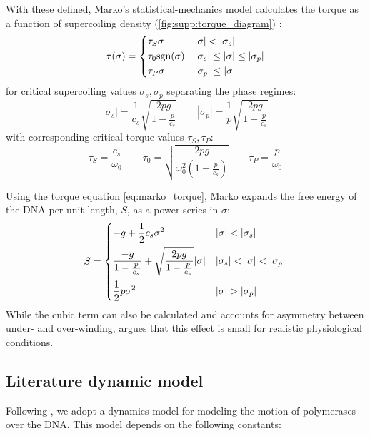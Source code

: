 \documentclass[11pt]{article}
\begin{document}
With these defined, Marko's statistical-mechanics model calculates the torque as a function of supercoiling density (\cref{fig:supp:torque_diagram}) \parencite{markoTorqueDynamicsLinking2007}:
\begin{equation}
    \tau(\sigma) = \begin{dcases} \tau_S \sigma & |\sigma| < |\sigma_s| \\ \tau_0 \text{sgn}(\sigma) & |\sigma_s| \leq |\sigma | \leq |\sigma_p| \\ \tau_P \sigma & |\sigma_p| \leq |\sigma|\end{dcases}
    \label{eq:marko_torque}
\end{equation}
for critical supercoiling values \(\sigma_s, \sigma_p\) separating the phase regimes:
\begin{equation}
    |\sigma_s| = \frac{1}{c_s} \sqrt{\frac{2pg}{1 - \frac{p}{c_s}}} \qquad |\sigma_p| = \frac{1}{p} \sqrt{\frac{2pg}{1 - \frac{p}{c_s}}}
    \label{eq:critical_sigma_values}
\end{equation}
with corresponding critical torque values \(\tau_S, \tau_P\):
\begin{equation}
    \tau_S = \frac{c_s}{\omega_0} \qquad \tau_0 = \sqrt{\frac{2 pg}{\omega_0^2 \left(1 - \frac{p}{c_s}\right)}} \qquad \tau_P = \frac{p}{\omega_0}
    \label{eq:critical_tau_values}
\end{equation}

Using the torque equation \cref{eq:marko_torque}, Marko expands the free energy of the DNA per unit length, \(S\), as a power series in \(\sigma\):
\begin{equation}
    S = \begin{dcases}
        -g + \frac{1}{2} c_s \sigma^2 & |\sigma| < |\sigma_s| \\
        \frac{-g}{1 - \frac{p}{c_s}} + \sqrt{\frac{2 p g}{1 - \frac{p}{c_s}}} |\sigma| & |\sigma_s| < |\sigma| < |\sigma_p| \\
        \frac{1}{2} p \sigma^2 & |\sigma| > |\sigma_p|
    \end{dcases}
    \label{eq:marko_energy}
\end{equation}
While the cubic term can also be calculated and accounts for asymmetry between under- and over-winding,  \textcite{markoTorqueDynamicsLinking2007} argues that this effect is small for realistic physiological conditions.

\subsection{Literature dynamic model}
Following \textcite{sevierPropertiesGeneExpression2018}, we adopt a dynamics model for modeling the motion of polymerases over the DNA. This model depends on the following constants:
\end{document}
